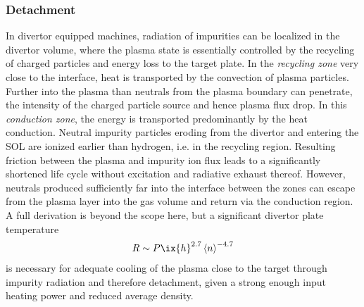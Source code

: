             \subsubsection*{Detachment}%
%
                In divertor equipped machines, radiation of impurities can be localized in the divertor volume, where the plasma state is essentially controlled by the recycling of charged particles and energy loss to the target plate. In the \textit{recycling zone} very close to the interface, heat is transported by the convection of plasma particles. Further into the plasma than neutrals from the plasma boundary can penetrate, the intensity of the charged particle source and hence plasma flux drop. In this \textit{conduction zone}, the energy is transported predominantly by the heat conduction. Neutral impurity particles eroding from the divertor and entering the SOL are ionized earlier than hydrogen, i.e. in the recycling region. Resulting friction between the plasma and impurity ion flux leads to a significantly shortened life cycle without excitation and radiative exhaust thereof. However, neutrals produced sufficiently far into the interface between the zones can escape from the plasma layer into the gas volume and return via the conduction region\cite{Wang2022}. A full derivation is beyond the scope here, but a significant divertor plate temperature%
%
                \begin{align}%
                    R\sim P\ix{h}^{2.7}\left\langle n\right\rangle^{-4.7}\nonumber%
                \end{align}%
%
                is necessary for adequate cooling of the plasma close to the target through impurity radiation and therefore detachment, given a strong enough input heating power and reduced average density\cite{Tokar2010,Greenwald2002}.%